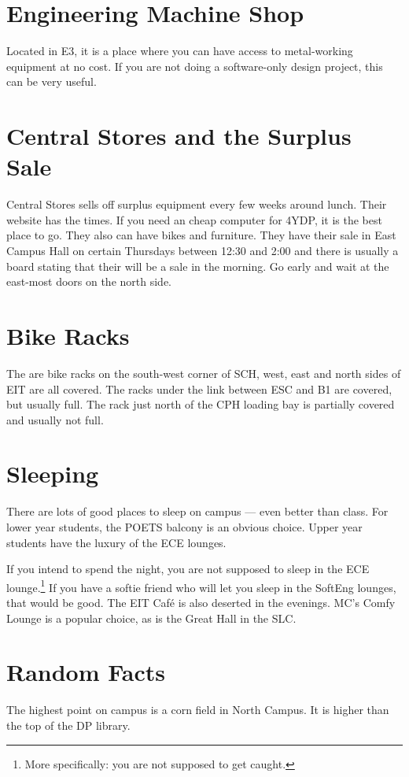 \documentclass{book}
\begin{document}
\section{Engineering Machine Shop}
Located in E3, it is a place where you can have access to metal-working equipment at no cost. If you are not doing a software-only design project, this can be very useful.

\section{Central Stores and the Surplus Sale}
Central Stores sells off surplus equipment every few weeks around lunch. Their website has the times. If you need an cheap computer for 4YDP, it is the best place to go. They also can have bikes and furniture. They have their sale in East Campus Hall on certain Thursdays between 12:30 and 2:00 and there is usually a board stating that their will be a sale in the morning. Go early and wait at the east-most doors on the north side.

\section{Bike Racks}
The are bike racks on the south-west corner of SCH, west, east and north sides of EIT are all covered. The racks under the link between ESC and B1 are covered, but usually full. The rack just north of the CPH loading bay is partially covered and usually not full.

\section{Sleeping}
There are lots of good places to sleep on campus --- even better than class. For lower year students, the POETS balcony is an obvious choice. Upper year students have the luxury of the ECE lounges.

If you intend to spend the night, you are not supposed to sleep in the ECE lounge.\footnote{More specifically: you are not supposed to get caught.} If you have a softie friend who will let you sleep in the SoftEng lounges, that would be good. The EIT Caf\'e is also deserted in the evenings. MC's Comfy Lounge is a popular choice, as is the Great Hall in the SLC.

\section{Random Facts}
The highest point on campus is a corn field in North Campus. It is higher than the top of the DP library.
\end{document}
